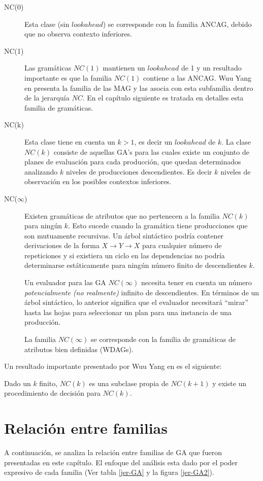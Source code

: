 \begin{description}
\item [NC(0)] Esta clase (sin $lookahead$) se corresponde con la familia ANCAG, debido que no observa contexto inferiores. 
\item [NC(1)] Las gramáticas $NC(1)$ mantienen un $lookahead$ de 1 y un resultado importante es que la familia $NC(1)$ contiene a las ANCAG. Wuu Yang en \cite{wuu-yang1} presenta la familia de las MAG y las asocia con esta subfamilia dentro de la jerarquía $NC$. En el capítulo siguiente es tratada en detalles esta familia de gramáticas.
\item[NC(k)] Esta clase tiene en cuenta un $k>1$, es decir un $lookahead$ de $k$. La clase $NC(k)$ consiste de aquellas GA's para las cuales existe un conjunto de planes de evaluación para cada producción, que quedan determinados analizando $k$ niveles de producciones descendientes. Es decir $k$ niveles de observación en los posibles contextos inferiores.
\item[NC($\infty$)] Existen gramáticas de atributos que no pertenecen a la familia $NC(k)$ para ningún $k$. Esto sucede cuando la gramática tiene producciones que son mutuamente recursivas. Un árbol sintáctico podría contener derivaciones de la forma $X \rightarrow Y \rightarrow X$ para cualquier número de repeticiones y si existiera un ciclo en las dependencias no podría determinarse estáticamente para ningún número finito de descendientes $k$.

Un evaluador para las GA $NC(\infty)$ necesita tener en cuenta un número \emph{potencialmente (no realmente)} infinito de descendientes. En términos de un árbol sintáctico, lo anterior significa que el evaluador necesitará ``mirar'' hasta las hojas para seleccionar un plan para una instancia de una producción.

\begin{theorem} La familia $NC(\infty)$ se corresponde con la familia de gramáticas de atributos bien definidas (WDAGs).
\end{theorem}
\end{description}

Un resultado importante presentado por Wuu Yang en \cite{wuu-yang2} es el siguiente:
\begin{theorem}
Dado un $k$ finito, $NC(k)$ es una subclase propia de $NC(k+1)$ y existe un procedimiento de decisión para $NC(k)$.
\end{theorem}


\section{Relación entre familias}
\label{sec:relfamag}
A continuación, se analiza la relación entre familias de GA que fueron presentadas en este capítulo. El enfoque del análisis esta dado por el poder expresivo de cada familia (Ver tabla \ref{jer-GA} y la figura \ref{jer-GA2}).

